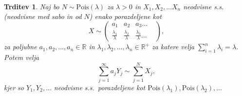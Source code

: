 \documentclass[12pt, a4paper, reqno]{amsart}
\theoremstyle{definition}
\theoremstyle{plain}
\newtheorem{trditev}[definicija]{Trditev}
\newcommand{\R}{\mathbb{R}}
\newcommand{\1}{\mathds{1}}
\newcommand{\Pois}[1]{\text{Pois}(#1)}
\begin{document}
    
    \begin{trditev}
        Naj bo $N\sim \Pois{\lambda}$  za $\lambda >0$ in $X_1, X_2, \dots X_n$ neodvisne s.s. (neodvisne 
        med sabo in od $N$) enako porazdeljene kot
        $$ X\sim
        \begin{pmatrix}
            a_1 & a_2 & a_3  \dots & \\
            \tfrac{\lambda_1}{\lambda} & \tfrac{\lambda_2}{\lambda} & \tfrac{\lambda_3}{\lambda} \dots & 
        \end{pmatrix},
        $$
        za poljubne $a_1, a_2, \dots, a_n \in \R$ in 
        $\lambda_1, \lambda_2, \dots, \lambda_n \in \R^+$ za katere velja 
        ${\sum_{i=1}^n\lambda_i = \lambda}$.
        Potem velja 
        \begin{equation*}
            \sum_{j=1}^\infty a_jY_j \sim \sum_{j=1}^NX_j,
        \end{equation*}
        kjer so $Y_1,Y_2,  \dots$ neodvisne s.s.\ porazdeljene kot 
        $\Pois{\lambda_1},\Pois{\lambda_2}, \dots$
        \label{trd:NXjeEnakoaY}
    \end{trditev}
\end{document}
